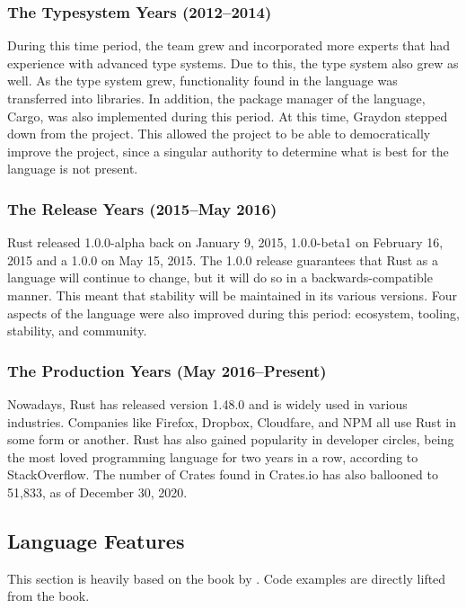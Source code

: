 \documentclass{article}
\begin{document}
  \subsubsection{The Typesystem Years (2012--2014)}
  During this time period, the team grew and incorporated more experts that had
  experience with advanced type systems. Due to this, the type system also grew
  as well. As the type system grew, functionality found in the language was
  transferred into libraries. In addition, the package manager of the language,
  Cargo, was also implemented during this period. At this time, Graydon stepped
  down from the project. This allowed the project to be able to democratically
  improve the project, since a singular authority to determine what is best for
  the language is not present.

  \subsubsection{The Release Years (2015--May 2016)}
  Rust released 1.0.0-alpha back on January 9, 2015, 1.0.0-beta1 on February 16,
  2015 and a 1.0.0 on May 15, 2015. The 1.0.0 release guarantees that Rust as a
  language will continue to change, but it will do so in a backwards-compatible
  manner. This meant that stability will be maintained in its various versions.
  Four aspects of the language were also improved during this period: ecosystem,
  tooling, stability, and community.

  \subsubsection{The Production Years (May 2016--Present)}
  Nowadays, Rust has released version 1.48.0 and is widely used in various
  industries. Companies like Firefox, Dropbox, Cloudfare, and NPM all use Rust
  in some form or another. Rust has also gained popularity in developer circles,
  being the most loved programming language for two years in a row, according to
  StackOverflow. The number of Crates found in Crates.io has also ballooned to
  51,833, as of December 30, 2020.

  \subsection{Language Features}

  This section is heavily based on the book  by
  \cite{klabnik_nichols_2018}. Code examples are directly lifted from the book.
\end{document}
